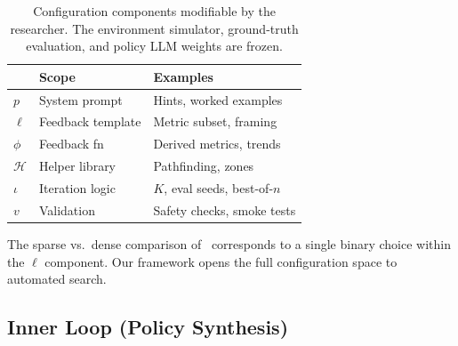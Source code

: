 \documentclass[10pt,twocolumn]{article}
\begin{document}
\begin{table}[t]
\caption{Configuration components modifiable by the researcher. The environment simulator, ground-truth evaluation, and policy LLM weights are frozen.}
\label{tab:config}
\centering
\small
\begin{tabular}{@{}lll@{}}
\toprule
 & Scope & Examples \\
\midrule
$p$ & System prompt & Hints, worked examples \\
$\ell$ & Feedback template & Metric subset, framing \\
$\phi$ & Feedback fn & Derived metrics, trends \\
$\mathcal{H}$ & Helper library & Pathfinding, zones \\
$\iota$ & Iteration logic & $K$, eval seeds, best-of-$n$ \\
$v$ & Validation & Safety checks, smoke tests \\
\bottomrule
\end{tabular}
\end{table}

The sparse vs.\ dense comparison of~\cite{gallego2026} corresponds to a single binary choice within the $\ell$ component. Our framework opens the full configuration space to automated search.

\subsection{Inner Loop (Policy Synthesis)}
\end{document}
